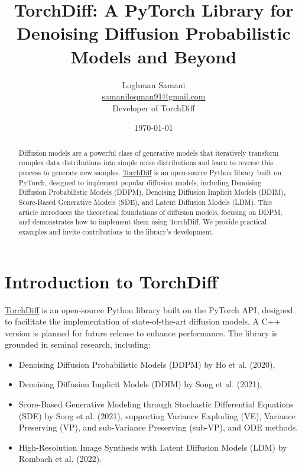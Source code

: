 \documentclass[12pt]{article}
\begin{document}
\title{\textbf{\LARGE TorchDiff: A PyTorch Library for Denoising Diffusion Probabilistic Models and Beyond}}
\author{Loghman Samani \\ \href{mailto:samaniloqman91@gmail.com}{samaniloqman91@gmail.com} \\ Developer of TorchDiff}
\date{\monthdayyeardate\today}
\maketitle

\begin{abstract}
Diffusion models are a powerful class of generative models that iteratively transform complex data distributions into simple noise distributions and learn to reverse this process to generate new samples. \href{https://github.com/LoqmanSamani/TorchDiff}{TorchDiff} is an open-source Python library built on PyTorch, designed to implement popular diffusion models, including Denoising Diffusion Probabilistic Models (DDPM), Denoising Diffusion Implicit Models (DDIM), Score-Based Generative Models (SDE), and Latent Diffusion Models (LDM). This article introduces the theoretical foundations of diffusion models, focusing on DDPM, and demonstrates how to implement them using TorchDiff. We provide practical examples and invite contributions to the library's development.
\end{abstract}

\section{Introduction to TorchDiff}

\href{https://github.com/LoqmanSamani/TorchDiff}{TorchDiff} is an open-source Python library built on the PyTorch API, designed to facilitate the implementation of state-of-the-art diffusion models. A C++ version is planned for future release to enhance performance. The library is grounded in seminal research, including:

\begin{itemize}
    \item Denoising Diffusion Probabilistic Models (DDPM) by Ho et al. (2020),
    \item Denoising Diffusion Implicit Models (DDIM) by Song et al. (2021),
    \item Score-Based Generative Modeling through Stochastic Differential Equations (SDE) by Song et al. (2021), supporting Variance Exploding (VE), Variance Preserving (VP), and sub-Variance Preserving (sub-VP), and ODE methods.
    \item High-Resolution Image Synthesis with Latent Diffusion Models (LDM) by Rombach et al. (2022).
\end{itemize}
\end{document}
